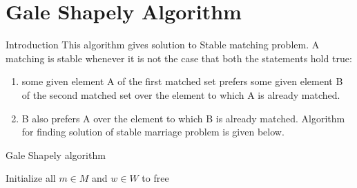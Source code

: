 \documentclass[11pt]{beamer}
\theoremstyle{definition}
\begin{document}
\section{Gale Shapely Algorithm}
\begin{frame}{Introduction}
This algorithm gives solution to Stable matching problem.
A matching is stable whenever it is not the case that both the statements hold true:
\begin{enumerate}
\item some given element A of the first matched set prefers some given element B of the second matched set over the element to which A is already matched.
\item B also prefers A over the element to which B is already matched.
Algorithm for finding solution of stable marriage problem is given below.
\end{enumerate}

\end{frame}

\begin{algorithm}[H]

\caption{Gale Shapely algorithm}
Initialize all $m \in M$ and $w \in W$ to free\\
\end{algorithm}
\end{document}
